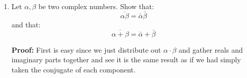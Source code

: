 \begin{enumerate}
	\subitem \textbf{Part 3b:} What is $\bar{\bar{\alpha}}?$
	
	\textbf{Proof:}
	Note 
	\begin{align*}
		\alpha = x + yi \;\; & \Leftrightarrow \;\; \bar{\alpha} = x - yi. \\ 
		\therefore \; \bar{\bar{\alpha}} &= \overline{x - yi} \\
	\end{align*}

	So now because the conjugate operation just changes the sign on the \textit{imaginary} part of $\alpha$ we have the straightforward result of:
	\begin{align*}
	\bar{\bar{\alpha}} &= \overline{x - yi} \\ 
	&= x + yi \\
	\therefore \; \bar{\bar{\alpha}} &= \alpha
	\end{align*}
	\qed

	
	\item Let $\alpha, \beta$ be two complex numbers. Show that: 
	$$\overline{\alpha \beta} = \bar{\alpha}\bar{\beta}$$ 
	and that:
	$$ \overline{\alpha + \beta} = \bar{\alpha} + \bar{\beta}$$
	
	\textbf{Proof:}
	First is easy since we just distribute out $\alpha\cdot\beta$ and gather reals and imaginary parts together and see it is the same result as if we had simply taken the conjugate of each component.


\end{enumerate}
